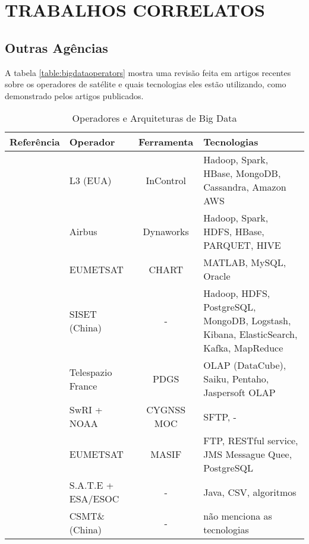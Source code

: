 
\chapter{TRABALHOS CORRELATOS}

\section{Outras Agências}

A tabela \ref{table:bigdataoperators} mostra uma revisão feita em artigos recentes sobre os operadores de satélite e quais tecnologias eles estão utilizando, como demonstrado pelos artigos publicados.

\begin{table}[!ht]%
  \begin{center}
  \caption{Operadores e Arquiteturas de Big Data}
  \begin{tabular}{|C{8em}|C{6em}|c|C{10em}|}
			\hline
			\bfseries Referência &\bfseries Operador &\bfseries Ferramenta &\bfseries Tecnologias \\
			\hline
			\cite{adamskiDataAnalyticsLarge2016} & L3 (EUA) & InControl & Hadoop, Spark, HBase, MongoDB, Cassandra, Amazon AWS \\
			\hline
			\cite{boussoufBigDataBased2018} & Airbus & Dynaworks & Hadoop, Spark, HDFS, HBase, PARQUET, HIVE \\
			\hline
			\cite{schulsterCHARTingFutureOffline2018} & EUMETSAT & CHART & MATLAB, MySQL, Oracle \\
			\hline
			\cite{zhangBigDataFramework2017} & SISET (China) & - & Hadoop, HDFS, PostgreSQL, MongoDB, Logstash, Kibana, ElasticSearch, Kafka, MapReduce \\
			\hline
			\cite{yvernesCopernicusGroundSegment2018} & Telespazio France & PDGS & OLAP (DataCube), Saiku, Pentaho, Jaspersoft OLAP \\
			\hline
			\cite{dischnerCYGNSSMOCMeeting2016} & SwRI + NOAA & CYGNSS MOC & SFTP, - \\
			\hline
			\cite{edwardsDealingBigData2018} & EUMETSAT & MASIF & FTP, RESTful service, JMS Messague Quee, PostgreSQL \\
			\hline
			\cite{evansDataMiningDrastically2016} & S.A.T.E + ESA/ESOC & - & Java, CSV, algoritmos \\
			\hline
			\cite{fenManagementOperationCommunication2016} & CSMT\& (China) & - & não menciona as tecnologias \\

\end{tabular}
\end{center}
\end{table}
